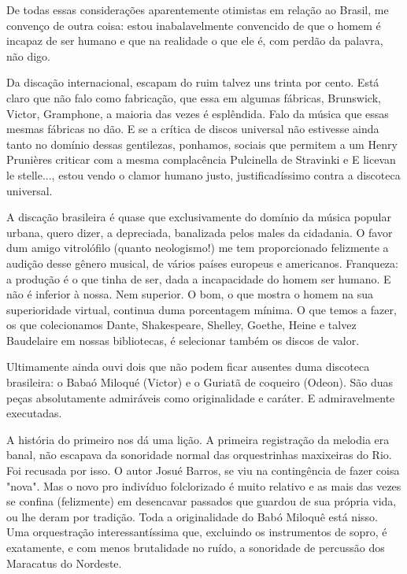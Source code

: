 De todas essas considerações aparentemente otimistas em relação ao
Brasil, me convenço de outra coisa: estou inabalavelmente convencido de
que o homem é incapaz de ser humano e que na realidade o que ele é, com
perdão da palavra, não digo.

Da discação internacional, escapam do ruim talvez uns trinta por cento.
Está claro que não falo como fabricação, que essa em algumas fábricas,
Brunswick, Victor, Gramphone, a maioria das vezes é esplêndida. Falo da
música que essas mesmas fábricas no dão. E se a crítica de discos
universal não estivesse ainda tanto no domínio dessas gentilezas,
ponhamos, sociais que permitem a um Henry Prunières criticar com a mesma
complacência Pulcinella de Stravinki e E licevan le stelle..., estou
vendo o clamor humano justo, justificadíssimo contra a discoteca
universal.

A discação brasileira é quase que exclusivamente do domínio da música
popular urbana, quero dizer, a depreciada, banalizada pelos males da
cidadania. O favor dum amigo vitrolófilo (quanto neologismo!) me tem
proporcionado felizmente a audição desse gênero musical, de vários
países europeus e americanos. Franqueza: a produção é o que tinha de
ser, dada a incapacidade do homem ser humano. E não é inferior à nossa.
Nem superior. O bom, o que mostra o homem na sua superioridade virtual,
continua duma porcentagem mínima. O que temos a fazer, os que
colecionamos Dante, Shakespeare, Shelley, Goethe, Heine e talvez
Baudelaire em nossas bibliotecas, é selecionar também os discos de
valor.

Ultimamente ainda ouvi dois que não podem ficar ausentes duma discoteca
brasileira: o Babaó Miloqué (Victor) e o Guriatã de coqueiro (Odeon).
São duas peças absolutamente admiráveis como originalidade e caráter. E
admiravelmente executadas.

A história do primeiro nos dá uma lição. A primeira registração da
melodia era banal, não escapava da sonoridade normal das orquestrinhas
maxixeiras do Rio. Foi recusada por isso. O autor Josué Barros, se viu
na contingência de fazer coisa "nova". Mas o novo pro indivíduo
folclorizado é muito relativo e as mais das vezes se confina
(felizmente) em desencavar passados que guardou de sua própria vida, ou
lhe deram por tradição. Toda a originalidade do Babó Miloquê está nisso.
Uma orquestração interessantíssima que, excluindo os instrumentos de
sopro, é exatamente, e com menos brutalidade no ruído, a sonoridade de
percussão dos Maracatus do Nordeste.

